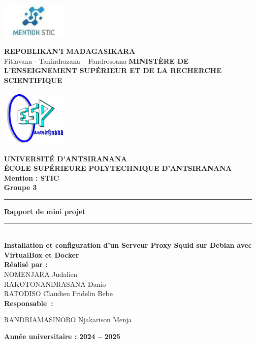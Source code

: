 \documentclass[12pt,a4paper]{article}
\begin{document}
\begin{center}
\begin{minipage}{0.2\textwidth}
    \centering
    \includegraphics[width=3.2cm]{logo_univ.png}
\end{minipage}
\begin{minipage}{0.55\textwidth}
    \centering
    \textbf{REPOBLIKAN’I MADAGASIKARA} \\[0.2cm]
    Fitiavana - Tanindrazana – Fandrosoana
    \textbf{MINISTÈRE DE L’ENSEIGNEMENT SUPÉRIEUR ET DE LA RECHERCHE SCIENTIFIQUE} \\
\end{minipage}
\begin{minipage}{0.2\textwidth}
    \centering
    \includegraphics[width=3.2cm]{logo_esp.png}
\end{minipage}

\vspace{0.5cm} %


\textbf{UNIVERSITÉ D’ANTSIRANANA} \\[0.2cm]
\textbf{ÉCOLE SUPÉRIEURE POLYTECHNIQUE D’ANTSIRANANA} \\[0.5cm]

\textbf{Mention : STIC} \\[0.1cm]
\textbf{Groupe 3} \\[1.2cm]
\rule{\textwidth}{0.5pt}
\textbf{Rapport de mini projet }
\rule{\textwidth}{0.5pt}\\[1.2cm]
\textbf{\LARGE Installation et configuration d’un Serveur Proxy Squid sur Debian avec VirtualBox et Docker} \\[1.2cm]

\textbf{Réalisé par :} \\[0.2cm]
NOMENJARA Judalien \\ 
RAKOTONANDRASANA Danio \\
RATODISO Claudien Fridelin Bebe \\[1.2cm]

\textbf{Responsable :}

RANDRIAMASINORO Njakarison Menja 

\vfill
\textbf{Année universitaire : 2024 -- 2025}
\end{center}
\end{document}
